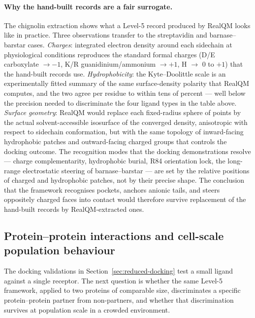 \documentclass[11pt]{article}
\begin{document}
\paragraph{Why the hand-built records are a fair surrogate.}
The chignolin extraction shows what a Level-5 record produced by RealQM looks like in practice. Three observations transfer to the streptavidin and barnase--barstar cases. \emph{Charges}: integrated electron density around each sidechain at physiological conditions reproduces the standard formal charges (D/E carboxylate $\to -1$, K/R guanidinium/ammonium $\to +1$, H $\to$ 0 to $+1$) that the hand-built records use. \emph{Hydrophobicity}: the Kyte--Doolittle scale is an experimentally fitted summary of the same surface-density polarity that RealQM computes, and the two agree per residue to within tens of percent --- well below the precision needed to discriminate the four ligand types in the table above. \emph{Surface geometry}: RealQM would replace each fixed-radius sphere of points by the actual solvent-accessible isosurface of the converged density, anisotropic with respect to sidechain conformation, but with the same topology of inward-facing hydrophobic patches and outward-facing charged groups that controls the docking outcome. The recognition modes that the docking demonstrations resolve --- charge complementarity, hydrophobic burial, R84 orientation lock, the long-range electrostatic steering of barnase--barstar --- are set by the relative positions of charged and hydrophobic patches, not by their precise shape. The conclusion that the framework recognises pockets, anchors anionic tails, and steers oppositely charged faces into contact would therefore survive replacement of the hand-built records by RealQM-extracted ones.

\subsection{Protein--protein interactions and cell-scale population behaviour}\label{sec:ppi}

The docking validations in Section~\ref{sec:reduced-docking} test a small ligand against a single receptor. The next question is whether the same Level-5 framework, applied to two proteins of comparable size, discriminates a specific protein--protein partner from non-partners, and whether that discrimination survives at population scale in a crowded environment.
\end{document}
